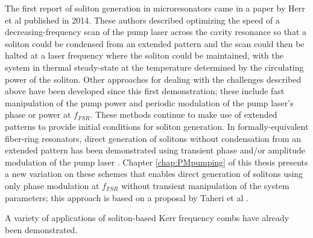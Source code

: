 {The first report of soliton generation in microresonators came in a paper by Herr et al published in 2014\cite{Herr2014}. These authors described optimizing the speed of a decreasing-frequency scan of the pump laser across the cavity resonance so that a soliton could be condensed from an extended pattern and the scan could then be halted at a laser frequency where the soliton could be maintained, with the system in thermal steady-state at the temperature determined by the circulating power of the soliton. Other approaches for dealing with the challenges described above have been developed since this first demonstration; these include fast manipulation of the pump power \cite{Brasch2016,Yi2015} and periodic modulation of the pump laser's phase or power at $f_{FSR}$\cite{Lobanov2016,Obrzud2017}. These methods continue to make use of extended patterns to provide initial conditions for soliton generation. In formally-equivalent fiber-ring resonators, direct generation of solitons without condensation from an extended pattern has been demonstrated using transient phase and/or amplitude modulation of the pump laser \cite{Jang2015,Jang2015a,Wang2018}. Chapter \ref{chap:PMpumping} of this thesis presents a new variation on these schemes that enables direct generation of solitons using only phase modulation at $f_{FSR}$ without transient manipulation of the system parameters; this approach is based on a proposal by Taheri et al \cite{Taheri2015}. 

A variety of applications of soliton-based Kerr frequency combs have already been demonstrated. 




%



}
